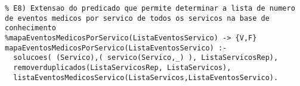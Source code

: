 \documentclass[
  oneside,
  10pt, a4paper,
  footinclude=true,
  headinclude=true,
  cleardoublepage=empty
]{scrbook}
\begin{document}
\begin{lstlisting}
% E8) Extensao do predicado que permite determinar a lista de numero de eventos medicos por servico de todos os servicos na base de conhecimento 
%mapaEventosMedicosPorServico(ListaEventosServico) -> {V,F} 
mapaEventosMedicosPorServico(ListaEventosServico) :- 
  solucoes( (Servico),( servico(Servico,_) ), ListaServicosRep),
  removerduplicados(ListaServicosRep, ListaServicos),
  listaEventosMedicosServico(ListaServicos,ListaEventosServico).
\end{lstlisting}

	
\end{document}
